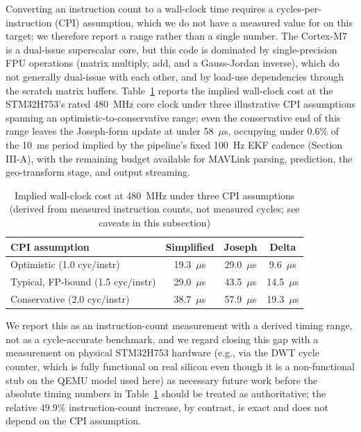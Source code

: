 \documentclass[conference]{IEEEtran}
\begin{document}
Converting an instruction count to a wall-clock time requires a cycles-per-instruction (CPI) assumption, which we do not have a measured value for on this target; we therefore report a range rather than a single number. The Cortex-M7 is a dual-issue superscalar core, but this code is dominated by single-precision FPU operations (matrix multiply, add, and a Gauss-Jordan inverse), which do not generally dual-issue with each other, and by load-use dependencies through the scratch matrix buffers. Table~\ref{tab:timing} reports the implied wall-clock cost at the STM32H753's rated 480~MHz core clock \cite{r10} under three illustrative CPI assumptions spanning an optimistic-to-conservative range; even the conservative end of this range leaves the Joseph-form update at under 58~$\mu$s, occupying under $0.6\%$ of the 10~ms period implied by the pipeline's fixed 100~Hz EKF cadence (Section III-A), with the remaining budget available for MAVLink parsing, prediction, the geo-transform stage, and output streaming.

\begin{table}[htbp]
\caption{Implied wall-clock cost at 480~MHz under three CPI assumptions (derived from measured instruction counts, not measured cycles; see caveats in this subsection)}
\begin{center}
\footnotesize
\begin{tabular}{@{}lccc@{}}
\toprule
\textbf{CPI assumption} & \textbf{Simplified} & \textbf{Joseph} & \textbf{Delta} \\
\midrule
Optimistic (1.0 cyc/instr) & 19.3~$\mu$s & 29.0~$\mu$s & 9.6~$\mu$s \\
Typical, FP-bound (1.5 cyc/instr) & 29.0~$\mu$s & 43.5~$\mu$s & 14.5~$\mu$s \\
Conservative (2.0 cyc/instr) & 38.7~$\mu$s & 57.9~$\mu$s & 19.3~$\mu$s \\
\bottomrule
\end{tabular}
\end{center}
\label{tab:timing}
\end{table}

We report this as an instruction-count measurement with a derived timing range, not as a cycle-accurate benchmark, and we regard closing this gap with a measurement on physical STM32H753 hardware (e.g., via the DWT cycle counter, which is fully functional on real silicon even though it is a non-functional stub on the QEMU model used here) as necessary future work before the absolute timing numbers in Table~\ref{tab:timing} should be treated as authoritative; the relative $49.9\%$ instruction-count increase, by contrast, is exact and does not depend on the CPI assumption.
\end{document}
